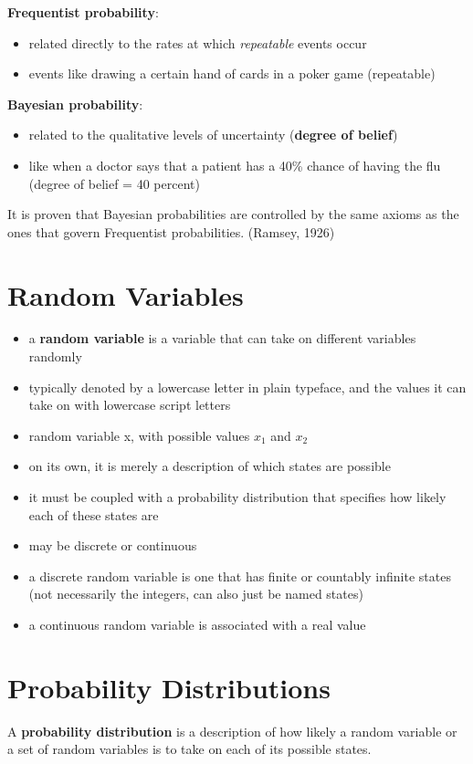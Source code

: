 \documentclass[11pt, twocolumn]{report}
\begin{document}
\textbf{Frequentist probability}:
\begin{itemize}
  \item related directly to the rates at which \textit{repeatable} events occur
  \item events like drawing a certain hand of cards in a poker game (repeatable)
\end{itemize}

\textbf{Bayesian probability}:
\begin{itemize}
  \item related to the qualitative levels of uncertainty (\textbf{degree of
      belief})
  \item like when a doctor says that a patient has a 40\% chance of having the
    flu (degree of belief = 40 percent)
\end{itemize}

It is proven that Bayesian probabilities are controlled by the same axioms as
the ones that govern Frequentist probabilities. (Ramsey, 1926)

\section{Random Variables}
\begin{itemize}
  \item a \textbf{random variable} is a variable that can take on different
    variables randomly
  \item typically denoted by a lowercase letter in plain typeface, and the
    values it can take on with lowercase script letters
  \item random variable x, with possible values $x_1$ and $x_2$
  \item on its own, it is merely a description of which states are possible 
  \item it must be coupled with a probability distribution that specifies how
    likely each of these states are
  \item may be discrete or continuous
  \item a discrete random variable is one that has finite or countably
    infinite states (not necessarily the integers, can also just be named
    states)
  \item a continuous random variable is associated with a real value
\end{itemize}

\section{Probability Distributions}
A \textbf{probability distribution} is a description of how likely a random
variable or a set of random variables is to take on each of its possible
states.
\end{document}

